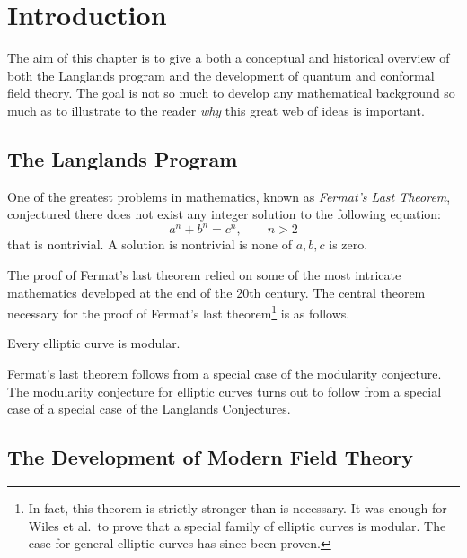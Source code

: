 \chapter{Introduction\label{ch:intro}}

The aim of this chapter is to give a both a conceptual and historical overview of both the Langlands program and the development of quantum and conformal field theory. The goal is not so much to develop any mathematical background so much as to illustrate to the reader \emph{why} this great web of ideas is important.

\section{The Langlands Program} %
\label{sec:the_langlands_program}

One of the greatest problems in mathematics, known as \emph{Fermat's Last Theorem}, conjectured there does not exist any integer solution to the following equation:
$$a^n + b^n = c^n, \qquad n > 2$$
that is nontrivial. A solution is nontrivial is none of $a, b, c$ is zero.

The proof of Fermat's last theorem relied on some of the most intricate mathematics developed at the end of the 20th century. The central theorem necessary for the proof of Fermat's last theorem\footnote{In fact, this theorem is strictly stronger than is necessary. It was enough for Wiles et al.\ to prove that a special family of elliptic curves is modular. The case for general elliptic curves has since been proven.} is as follows.
\begin{theorem}
	Every elliptic curve is modular.
\end{theorem}

Fermat's last theorem follows from a special case of the modularity conjecture. The modularity conjecture for elliptic curves turns out to follow from a special case of a special case of the Langlands Conjectures.


\section{The Development of Modern Field Theory} %
\label{sec:the_development_of_modern_field_theory}



